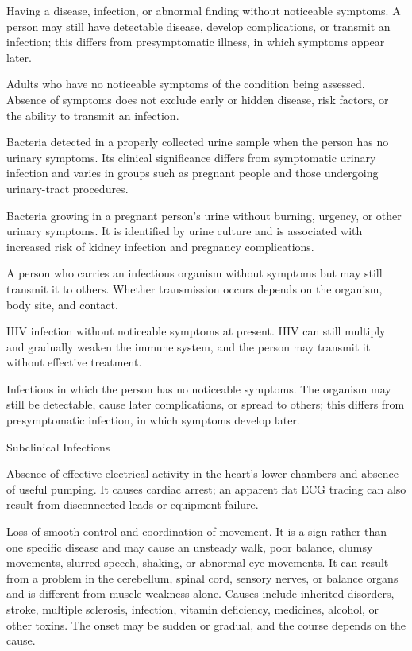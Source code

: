  Having a disease, infection, or abnormal finding without noticeable symptoms. A person may still have detectable disease, develop complications, or transmit an infection; this differs from presymptomatic illness, in which symptoms appear later.

 Adults who have no noticeable symptoms of the condition being assessed. Absence of symptoms does not exclude early or hidden disease, risk factors, or the ability to transmit an infection.

 Bacteria detected in a properly collected urine sample when the person has no urinary symptoms. Its clinical significance differs from symptomatic urinary infection and varies in groups such as pregnant people and those undergoing urinary-tract procedures.

 Bacteria growing in a pregnant person’s urine without burning, urgency, or other urinary symptoms. It is identified by urine culture and is associated with increased risk of kidney infection and pregnancy complications.

 A person who carries an infectious organism without symptoms but may still transmit it to others. Whether transmission occurs depends on the organism, body site, and contact.

 HIV infection without noticeable symptoms at present. HIV can still multiply and gradually weaken the immune system, and the person may transmit it without effective treatment.

 Infections in which the person has no noticeable symptoms. The organism may still be detectable, cause later complications, or spread to others; this differs from presymptomatic infection, in which symptoms develop later.

\synonyms
Subclinical Infections

 Absence of effective electrical activity in the heart’s lower chambers and absence of useful pumping. It causes cardiac arrest; an apparent flat ECG tracing can also result from disconnected leads or equipment failure.

 Loss of smooth control and coordination of movement. It is a sign rather than one specific disease and may cause an unsteady walk, poor balance, clumsy movements, slurred speech, shaking, or abnormal eye movements. It can result from a problem in the cerebellum, spinal cord, sensory nerves, or balance organs and is different from muscle weakness alone. Causes include inherited disorders, stroke, multiple sclerosis, infection, vitamin deficiency, medicines, alcohol, or other toxins. The onset may be sudden or gradual, and the course depends on the cause.

